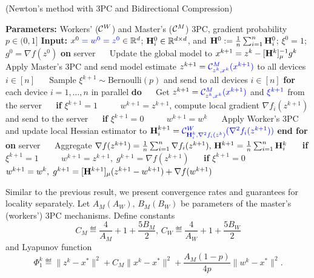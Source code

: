 \documentclass[11pt]{article}
\begin{document}
	\begin{algorithm}[h]
		\caption{ (Newton's method with {\color{blue}3PC} and {\color{blue}Bidirectional Compression)}}
		\label{alg:N3PC-BC}
		\begin{algorithmic}[1]
			\STATE \textbf{Parameters:} {\color{blue} Workers' (${\mathcal{C}}^W$) and Master's (${\mathcal{C}}^M$) 3PC, gradient probability $p\in(0,1]$}
			\STATE \textbf{Input:} $x^0\;{\color{blue}=w^0=z^0}\in\mathbb{R}^d$;  $\mathbf{H}_i^0 \in \mathbb{R}^{d\times d}$, and $\mathbf{H}^0 \; { := }\; \tfrac{1}{n}\sum_{i=1}^n \mathbf{H}_i^0$; {\color{blue}$\xi^0 = 1$}; $g^0 = \nabla f(z^0)$
			\STATE \textbf{on} server
			\STATE ~~ Update the global model to $x^{k+1} = z^k - [\mathbf{H}^k]_{\mu}^{-1} g^k$
			\STATE ~~ Apply {\color{blue} Master's 3PC} and send model estimate $z^{k+1} = {\color{blue}{\mathcal{C}}^M_{z^k, x^k} (x^{k+1})}$ to all devices $i\in[n]$
			\STATE ~~ {\color{blue}Sample $\xi^{k+1} \sim \text{Bernoulli}(p)$ and send to all devices $i\in[n]$}
			\STATE \textbf{for} each device $i = 1, \dots, n$ in parallel \textbf{do}
			\STATE ~~ Get $z^{k+1} = {\color{blue}{\mathcal{C}}^M_{z^k, x^k} (x^{k+1})}$ and ${\color{blue}\xi^{k+1}}$ from the server
			\STATE ~~ \textbf{if} {\color{blue}$\xi^{k+1} = 1$}
			\STATE ~~~~ $ w^{k+1} = z^{k+1}$, compute local gradient $\nabla f_i(z^{k+1})$ and send to the server
			\STATE ~~ \textbf{if} {\color{blue}$\xi^{k+1} = 0$}
			\STATE ~~~~ $w^{k+1} = w^k$
			\STATE ~~ Apply {\color{blue}Worker's 3PC} and update local Hessian estimator to $\mathbf{H}_i^{k+1} = {\color{blue}{\mathcal{C}}^W_{\mathbf{H}_i^k, \nabla^2 f_i(z^{k})} (\nabla^2 f_i(z^{k+1}))}$
			\STATE \textbf{end for}
			\STATE \textbf{on} server
			\STATE ~~ Aggregate $\nabla f(z^{k+1}) = \frac{1}{n}\sum_{i=1}^n \nabla f_i(z^{k+1}),\, \mathbf{H}^{k+1} = \frac{1}{n} \sum_{i=1}^n \mathbf{H}_i^k$
			\STATE ~~ \textbf{if} {\color{blue}$\xi^{k+1} = 1$}
			\STATE ~~~~ $w^{k+1} = z^{k+1},\; g^{k+1} = \nabla f(z^{k+1})$
			\STATE ~~ \textbf{if} {\color{blue}$\xi^{k+1} = 0$}
			\STATE ~~~~ $w^{k+1} = w^k,\; g^{k+1} = [\mathbf{H}^{k+1}]_{\mu}(z^{k+1}-w^{k+1}) + \nabla f(w^{k+1})$ 
		\end{algorithmic}
	\end{algorithm}
	
	Similar to the previous result, we present convergence rates and guarantees for locality separately. Let $A_M (A_W),\, B_M (B_W)$ be parameters of the master's (workers') 3PC mechanisms. Define constants $$C_M \eqdef  \frac{4}{A_M} + 1 + \frac{5B_M}{2},\, C_W \eqdef  \frac{4}{A_W} + 1 + \frac{5B_W}{2}$$ and Lyapunov function $$\Phi_1^k \eqdef \|z^k-x^*\|^2 + C_M\|x^k-x^*\|^2 + \frac{A_M(1-p)}{4p} \|w^k-x^*\|^2.$$
	
\end{document}
